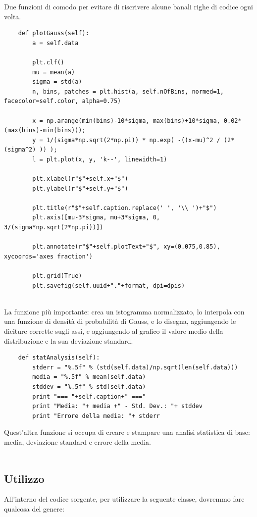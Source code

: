 Due funzioni di comodo per evitare di riscrivere alcune banali righe di codice ogni volta.

\begin{lstlisting}      
    def plotGauss(self):
        a = self.data
        
        plt.clf()
        mu = mean(a)
        sigma = std(a)
        n, bins, patches = plt.hist(a, self.nOfBins, normed=1, facecolor=self.color, alpha=0.75)
        
        x = np.arange(min(bins)-10*sigma, max(bins)+10*sigma, 0.02*(max(bins)-min(bins)));
        y = 1/(sigma*np.sqrt(2*np.pi)) * np.exp( -((x-mu)^2 / (2* (sigma^2) )) );
        l = plt.plot(x, y, 'k--', linewidth=1)
        
        plt.xlabel(r"$"+self.x+"$")
        plt.ylabel(r"$"+self.y+"$")
        
        plt.title(r"$"+self.caption.replace(' ', '\\ ')+"$")
        plt.axis([mu-3*sigma, mu+3*sigma, 0, 3/(sigma*np.sqrt(2*np.pi))])
        
        plt.annotate(r"$"+self.plotText+"$", xy=(0.075,0.85), xycoords='axes fraction')
        
        plt.grid(True)
        plt.savefig(self.uuid+"."+format, dpi=dpis)
        
\end{lstlisting}

La funzione più importante: crea un istogramma normalizzato, lo interpola con una funzione di densità di probabilità di Gauss, e lo disegna, aggiungendo le diciture corrette sugli assi, e aggiungendo al grafico il valore medio della distribuzione e la sua deviazione standard.

\begin{lstlisting}
    def statAnalysis(self):
        stderr = "%.5f" % (std(self.data)/np.sqrt(len(self.data)))
        media = "%.5f" % mean(self.data)
        stddev = "%.5f" % std(self.data)
        print "=== "+self.caption+" ==="
        print "Media: "+ media +" - Std. Dev.: "+ stddev
        print "Errore della media: "+ stderr
\end{lstlisting}

Quest'altra funzione si occupa di creare e stampare una analisi statistica di base: media, deviazione standard e errore della media.
\\
\\
\subsection{Utilizzo}
All'interno del codice sorgente, per utilizzare la seguente classe, dovremmo fare qualcosa del genere:

